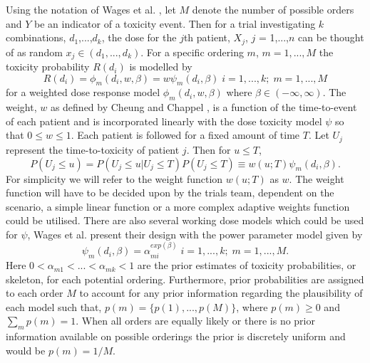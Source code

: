 Using the notation of Wages et al. \cite{wagesContinualReassessmentMethod2011,wagesUsingTimetoeventContinual2013}, let $M$ denote the number of possible orders and $Y$ be an indicator of a toxicity event. Then for a trial investigating $k$ combinations, $d_{1}$,...,$d_{k}$, the dose for the $j$th patient, $X_{j}$, $j$ = 1,...,$n$ can be thought of as random $x_{j} \in (d_{1}, ..., d_{k})$. For a specific ordering $m$, $m = 1,...,M$ the toxicity probability $R(d_{i})$ is modelled by 
\begin{equation}
R(d_{i}) =  \phi_m(d_i,w,\beta) = w\psi_m(d_i,\beta) \; i = 1, ..., k; \; m = 1, ...,M
\end{equation}
for  a weighted dose response model $\phi_m(d_i,w,\beta)$ where $\beta \in (-\infty, \infty)$. The weight, $w$ as defined by Cheung and Chappel \cite{cheungSequentialDesignsPhase2000}, is a function of the time-to-event of each patient and is incorporated linearly with the dose toxicity model $\psi$ so that $0 \leq w \leq 1$. Each patient is followed for a fixed amount of time $T$. Let $U_j$ represent the time-to-toxicity of patient $j$. Then for $u \leq T$, 
\begin{equation}
	P(U_j \leq u ) = P(U_j \leq u |U_j \leq T)P(U_j \leq T) \equiv w(u;T) \psi_m(d_i,\beta).
\end{equation}
For simplicity we will refer to the weight function $w(u;T)$ as $w$. The weight function will have to be decided upon by the trials team, dependent on the scenario, a simple linear function or a more complex adaptive weights function could be utilised. There are also several working dose models which could be used for $\psi$, Wages et al. \cite{wagesUsingTimetoeventContinual2013} present their design with the power parameter model given by 
\begin{equation}
	\psi_m(d_i,\beta) = \alpha_{mi}^{exp(\beta)} \; i = 1,...,k; \; m = 1,...,M.
\end{equation}
Here $0 < \alpha_{m1} < ... < \alpha_{mk} < 1$ are the prior estimates of toxicity probabilities, or skeleton, for each potential ordering. Furthermore, prior probabilities are assigned to each order $M$ to account for any prior information regarding the plausibility of each model such that, $p(m) = \{p(1),...,p(M)\}$, where $p(m) \geq 0$ and $\sum_mp(m)=1$. When all orders are equally likely or there is no prior information available on possible orderings the prior is discretely uniform and would be $p(m) = 1/M$. 

